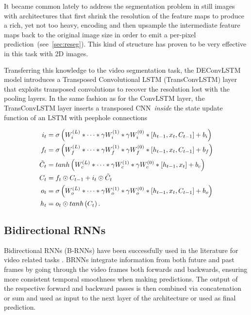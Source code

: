 It became common lately to address the segmentation problem in still images
with architectures that first shrink the resolution of the feature maps to
produce a rich, yet not too heavy, encoding and then upsample the intermediate
feature maps back to the original image size in order to emit a per-pixel
prediction~(see~\autoref{sec:reseg}). This kind of structure has proven to be
very effective in this task with 2D images.

Transferring this knowledge to the video segmentation task, the DEConvLSTM
model introduces a Transposed Convolutional LSTM (TransConvLSTM) layer that
exploits transposed convolutions to recover the resolution lost with the
pooling layers. In the same fashion as for the ConvLSTM layer, the
TransConvLSTM layer inserts a transposed CNN~\emph{inside} the state update
function of an LSTM with peephole connections

\begin{equation}\label{eq:deconvLSTM_dec}
\begin{split}
    i_t &= \sigma\left(W_i^{(L)} * \dots * \gamma W_i^{(1)} *
        \gamma W_i^{(0)} * \left[h_{t-1}, x_t, C_{t-1}\right] + b_i \right)\\
    f_t &= \sigma\left(W_f^{(L)} * \dots * \gamma W_f^{(1)} *
        \gamma W_f^{(0)} * \left[h_{t-1}, x_t, C_{t-1}\right] + b_f \right)\\
    \tilde C_t &= tanh \left(W_c^{(L)} * \dots * \gamma W_c^{(1)} *
        \gamma W_c^{(0)} * \left[h_{t-1}, x_t\right] + b_c \right)\\
    C_t &= f_t \odot C_{t-1} + i_t \odot \tilde C_t\\
    o_t &= \sigma\left(W_o^{(L)} * \dots * \gamma W_o^{(1)} *
        \gamma W_o^{(0)} * \left[h_{t-1}, x_t, C_{t-1}\right] + b_o \right)\\
    h_t &= o_t \odot tanh \left(C_t\right).
\end{split}
\end{equation}

\subsection{Bidirectional RNNs}
Bidirectional RNNs (B-RNNs) \cite{Schuster1997bidirecrnn} have been
successfully used in the literature for video related tasks \cite{Du2015_CVPR}.
BRNNs integrate information from both future and past frames by going through
the video frames both forwards and backwards, ensuring more consistent temporal
smoothness when making predictions. The output of the respective forward and
backward passes is then combined via concatenation or sum and used as input to
the next layer of the architecture or used as final prediction.


